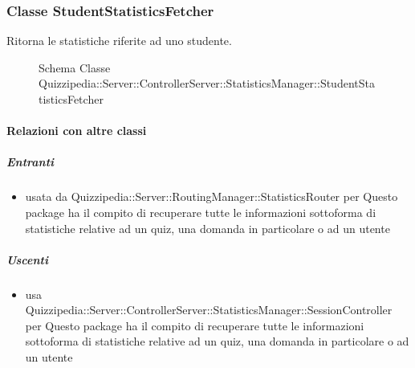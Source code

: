 \subsubsection{Classe StudentStatisticsFetcher}
Ritorna le statistiche riferite ad uno studente.
\begin{figure}[H]
\centering
\noindent{}
\caption[Schema Classe StudentStatisticsFetcher]{Schema Classe Quizzipedia::Server::ControllerServer::StatisticsManager::StudentStatisticsFetcher}
\end{figure}
\paragraph{Relazioni con altre classi}
\subparagraph{Entranti}
\begin{itemize}
\item usata da Quizzipedia::Server::RoutingManager::StatisticsRouter per Questo package ha il compito di recuperare tutte le informazioni sottoforma di statistiche relative ad un quiz, una domanda in particolare o ad un utente
\end{itemize}
\subparagraph{Uscenti}
\begin{itemize}
\item usa Quizzipedia::Server::ControllerServer::StatisticsManager::SessionController per Questo package ha il compito di recuperare tutte le informazioni sottoforma di statistiche relative ad un quiz, una domanda in particolare o ad un utente
\end{itemize}
